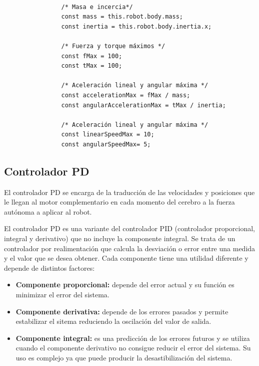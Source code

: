 \small
\begin{verbatim}

                /* Masa e incercia*/
                const mass = this.robot.body.mass;
                const inertia = this.robot.body.inertia.x;
                
                /* Fuerza y torque máximos */
                const fMax = 100;
                const tMax = 100;
                    
                /* Aceleración lineal y angular máxima */
                const accelerationMax = fMax / mass;
                const angularAccelerationMax = tMax / inertia;
                
                /* Aceleración lineal y angular máxima */
                const linearSpeedMax = 10;
                const angularSpeedMax= 5; 
\end{verbatim}



\subsection{Controlador PD}
\normalsize
El controlador PD se encarga de la traducción de las velocidades y posiciones que le llegan al motor complementario en cada momento del cerebro a la fuerza autónoma a aplicar al robot. \newline

El controlador PD es una variante del controlador PID (controlador proporcional, integral y derivativo) que no incluye la componente integral. Se trata de un controlador por realimentación que calcula la desviación o error entre una medida y el valor que se desea obtener. Cada componente tiene una utilidad diferente y depende de distintos factores:
\begin{itemize}
    \item \textbf{Componente proporcional: }depende del error actual y su función es minimizar el error del sistema.
    \item \textbf{Componente derivativa: }depende de los errores pasados y permite estabilizar el sitema reduciendo la oscilación del valor de salida.
    \item \textbf{Componente integral: }es una predicción de los errores futuros y se utiliza cuando el componente derivativo no consigue reducir el error del sistema. Su uso es complejo ya que puede producir la desastibilización del sistema.
\end{itemize}

